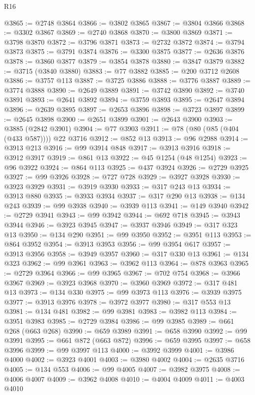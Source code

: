 \begin{lexlean}{R16}
\begin{coremodule}
@3865 := @2748 @3864
@3866 := @3802 @3865
@3867 := @3804 @3866
@3868 := @3302 @3867
@3869 := @2740 @3868
@3870 := @3800 @3869
@3871 := @3798 @3870
@3872 := @3796 @3871
@3873 := @2732 @3872
@3874 := @3794 @3873
@3875 := @3791 @3874
@3876 := @3300 @3875
@3877 := @2636 @3876
@3878 := @3860 @3877
@3879 := @3854 @3878
@3880 := @3847 @3879
@3882 := @3715 (@3840 @3880)
@3883 := @77 @3882
@3885 := @200 @3712 @2608
@3886 := @3757 @113
@3887 := @3725 @3886
@3888 := @3776 @3887
@3889 := @3774 @3888
@3890 := @2649 @3889
@3891 := @3742 @3890
@3892 := @3740 @3891
@3893 := @2641 @3892
@3894 := @3759 @3893
@3895 := @2647 @3894
@3896 := @2639 @3895
@3897 := @2653 @3896
@3898 := @3723 @3897
@3899 := @2645 @3898
@3900 := @2651 @3899
@3901 := @2643 @3900
@3903 := @3885 (@2842 @3901)
@3904 := @77 @3903
@3911 := @78 (@80 (@85 (@404 (@433 @587)))) @22 @3716
@3912 := @852 @13
@3913 := @96 @2988
@3914 := @3913 @213
@3916 := @99 @3914 @848
@3917 := @3913 @3916
@3918 := @3912 @3917
@3919 := @861 @13
@3922 := @45 @1254 (@48 @1254)
@3923 := @96 @3922
@3924 := @864 @113
@3925 := @437 @3924
@3926 := @2729 @3925
@3927 := @99 @3926
@3928 := @727 @728
@3929 := @3927 @3928
@3930 := @3923 @3929
@3931 := @3919 @3930
@3933 := @317 @243 @13
@3934 := @3913 @880
@3935 := @3933 @3934
@3937 := @317 @290 @13
@3938 := @134 @243
@3939 := @99 @3938
@3940 := @3939 @113
@3941 := @149 @3940
@3942 := @2729 @3941
@3943 := @99 @3942
@3944 := @692 @718
@3945 := @3943 @3944
@3946 := @3923 @3945
@3947 := @3937 @3946
@3949 := @317 @323 @13
@3950 := @134 @290
@3951 := @99 @3950
@3952 := @3951 @113
@3953 := @864 @3952
@3954 := @3913 @3953
@3956 := @99 @3954 @617
@3957 := @3913 @3956
@3958 := @3949 @3957
@3960 := @317 @330 @13
@3961 := @134 @323
@3962 := @99 @3961
@3963 := @3962 @113
@3964 := @878 @3963
@3965 := @2729 @3964
@3966 := @99 @3965
@3967 := @702 @754
@3968 := @3966 @3967
@3969 := @3923 @3968
@3970 := @3960 @3969
@3972 := @317 @481 @13
@3973 := @134 @330
@3975 := @99 @3973 @113
@3976 := @3939 @3975
@3977 := @3913 @3976
@3978 := @3972 @3977
@3980 := @317 @553 @13
@3981 := @134 @481
@3982 := @99 @3981
@3983 := @3982 @113
@3984 := @3951 @3983
@3985 := @2729 @3984
@3986 := @99 @3985
@3989 := @661 @268 (@663 @268)
@3990 := @659 @3989
@3991 := @658 @3990
@3992 := @99 @3991
@3995 := @661 @872 (@663 @872)
@3996 := @659 @3995
@3997 := @658 @3996
@3999 := @99 @3997 @113
@4000 := @3992 @3999
@4001 := @3986 @4000
@4002 := @3923 @4001
@4003 := @3980 @4002
@4004 := @2635 @3716
@4005 := @134 @553
@4006 := @99 @4005
@4007 := @3982 @3975
@4008 := @4006 @4007
@4009 := @3962 @4008
@4010 := @4004 @4009
@4011 := @4003 @4010

\end{coremodule}
\end{lexlean}
